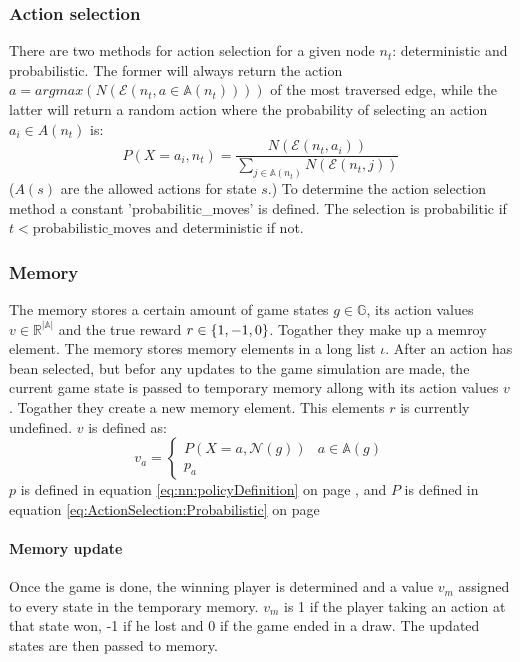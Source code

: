 \documentclass[12pt]{article}
\newcommand{\equationref}[1]{equation \ref{#1} on page \pageref{#1}}
\begin{document}
\subsubsection{Action selection}\label{sec:training:actionSelection}
There are two methods for action selection for a given node \(n_t\): deterministic and probabilistic. The former will always return the action \(a = argmax(N(\mathcal{E}(n_t, a \in \mathbb A(n_t))))\) of the most traversed edge, while the latter will return a random action where the probability of selecting an action \(a_i \in A(n_t)\) is:
\begin{equation} \label{eq:ActionSelection:Probabilistic}
P(X=a_i, n_t) = \frac{N(\mathcal{E}(n_t, a_i))}{\sum_{j \in \mathbb A(n_t)} N(\mathcal{E}(n_t, j))}
\end{equation}
(\(A(s)\) are the allowed actions for state \(s\).) To determine the action selection method a constant 'probabilitic\_moves' is defined. The selection is probabilitic if \(t < \text{probabilistic\_moves}\) and deterministic if not.

\subsubsection{Memory}
\label{sec:memory}
The memory stores a certain amount of game states \(g \in \mathbb G\), its action values \(v \in \mathbb R^{|\mathbb A|}\) and the true reward \(r \in \mathbb \{1, -1, 0\}\). Togather they make up a memroy element. The memory stores memory elements in a long list \(\iota\). After an action has bean selected, but befor any updates to the game simulation are made, the current game state is passed to temporary memory allong with its action values \(v\). Togather they create a new memory element. This elements \(r\) is currently undefined. \(v\) is defined as: 
\begin{equation} \label{eq:Memory:ActionValuesDefinition}
v_a = 
\begin{cases}
P(X=a, \mathcal N(g)) & a \in \mathbb A(g)\\
p_a &
\end{cases}
\end{equation}
\(p\) is defined in \equationref{eq:nn:policyDefinition}, and \(P\) is defined in \equationref{eq:ActionSelection:Probabilistic}

\paragraph{Memory update}
Once the game is done, the winning player is determined and a value \(v_m\) assigned to every state in the temporary memory. \(v_m\) is 1 if the player taking an action at that state won, -1 if he lost and 0 if the game ended in a draw. The updated states are then passed to memory.
\end{document}
